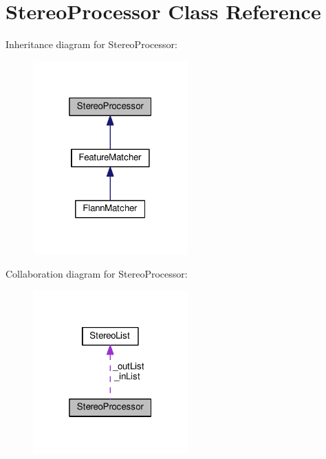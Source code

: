 \hypertarget{classStereoProcessor}{}\section{Stereo\+Processor Class Reference}
\label{classStereoProcessor}


Inheritance diagram for Stereo\+Processor\+:\nopagebreak
\begin{figure}[H]
\begin{center}
\leavevmode
\includegraphics[width=169pt]{classStereoProcessor__inherit__graph}
\end{center}
\end{figure}


Collaboration diagram for Stereo\+Processor\+:\nopagebreak
\begin{figure}[H]
\begin{center}
\leavevmode
\includegraphics[width=169pt]{classStereoProcessor__coll__graph}
\end{center}
\end{figure}
